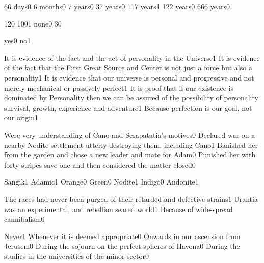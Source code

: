 {66 days}{0}
{6 months}{0}
{7 years}{0}
{37 years}{0}
{117 years}{1}
{122 years}{0}
{666 years}{0}
\qstop

{12}{0}
{100}{1}
{none}{0}
{3}{0}
\qstop


{yes}{0}
{no}{1}
\qstop

{It is evidence of the fact and the act of personality in the Universe}{1}
{It is evidence of the fact that the First Great Source and Center is not just a force but also a personality}{1}
{It is evidence that our universe is personal and progressive and not merely mechanical or passively perfect}{1}
{It is proof that if our existence is dominated by Personality then we can be assured of the possibility of personality survival, growth, experience and adventure}{1}
{Because perfection is our goal, not our origin}{1}
\qstop

{Were very understanding of Cano and Serapatatia's motives}{0}
{Declared war on a nearby Nodite settlement utterly destroying them, including Cano}{1}
{Banished her from the garden and chose a new leader and mate for Adam}{0}
{Punished her with forty stripes save one and then considered the matter closed}{0}
\qstop

{Sangik}{1}
{Adamic}{1}
{Orange}{0}
{Green}{0}
{Nodite}{1}
{Indigo}{0}
{Andonite}{1}
\qstop

{The races had never been purged of their retarded and defective strains}{1}
{Urantia was an experimental, and rebellion seared world}{1}
{Because of wide-spread cannibalism}{0}
\qstop

{Never}{1}
{Whenever it is deemed appropriate}{0}
{Onwards in our ascension from Jerusem}{0}
{During the sojourn on the perfect spheres of Havona}{0}
{During the studies in the universities of the minor sector}{0}
\qstop

